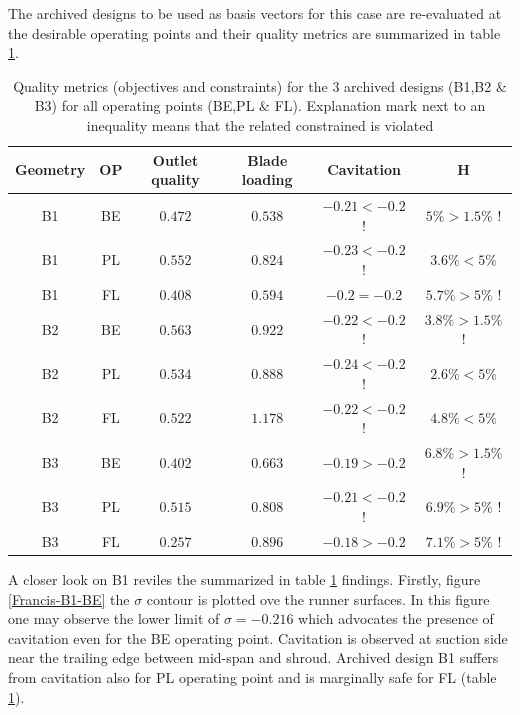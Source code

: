 The archived designs to be used as basis vectors for this case are re-evaluated at the desirable operating points and their quality metrics are summarized in table \ref{reuse}.

\begin{table}[h!]
\begin{center}
\begin{tabular}{ |c|c|c|c|c|c| }
\hline
Geometry & OP & Outlet quality & Blade loading  & Cavitation & H\\
\hline
B1 & BE & $0.472$ & $0.538$ & $-0.21 < -0.2$ ! & $ 5\% >1.5\%$ ! \\
B1 & PL & $0.552$ & $0.824$ & $-0.23 < -0.2$ ! & $ 3.6\% <5\%$ \\
B1 & FL & $0.408$ & $0.594$ & $-0.2 = -0.2$  & $ 5.7\% >5\%$ ! \\
\hline
\hline
B2 & BE & $0.563$ & $0.922$ & $-0.22 < -0.2$ ! & $ 3.8\% >1.5\%$ ! \\
B2 & PL & $0.534$ & $0.888$ & $-0.24 < -0.2$ ! & $ 2.6\% <5\%$  \\
B2 & FL & $0.522$ & $1.178$ & $-0.22 < -0.2$ ! & $ 4.8\% <5\%$  \\
\hline
\hline
B3 & BE & $0.402$ & $0.663$ & $-0.19 > -0.2$  & $ 6.8\% >1.5\%$ ! \\
B3 & PL & $0.515$ & $0.808$ & $-0.21 < -0.2$ ! & $ 6.9\% >5\%$ ! \\
B3 & FL & $0.257$ & $0.896$ & $-0.18 > -0.2$  & $ 7.1\% >5\%$ ! \\
\hline
\end{tabular}
\caption{Quality metrics (objectives and constraints) for the 3 archived designs (B1,B2 $\&$ B3) for all operating points (BE,PL $\&$ FL). Explanation mark next to an inequality means that the related constrained is violated}
\label{reuse}
\end{center}
\end{table}

A closer look on B1 reviles the summarized in table \ref{reuse} findings. Firstly, figure \ref{Francis-B1-BE} the $\sigma$ contour is plotted ove the runner surfaces. In this figure one may observe the lower limit of $\sigma = -0.216$ which advocates the presence of cavitation even for the BE operating point. Cavitation is observed at suction side near the trailing edge between mid-span and shroud. Archived design B1 suffers from cavitation also for PL operating point and is marginally safe for FL (table \ref{reuse}). 

